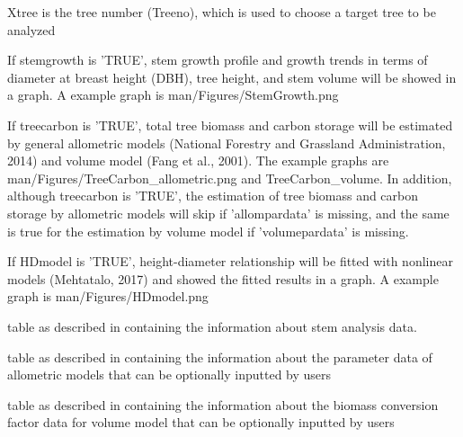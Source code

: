 \documentclass[a4paper]{book}
\begin{document}
\begin{Arguments}
\begin{ldescription}
\item[\code{xtree}] Xtree is the tree number (Treeno), which is used to choose a target tree to be analyzed

\item[\code{stemgrowth}] If stemgrowth is 'TRUE', stem growth profile and growth trends in terms of diameter at breast height (DBH), tree height, and stem volume will be showed in a graph. A example graph is man/Figures/StemGrowth.png

\item[\code{treecarbon}] If treecarbon is 'TRUE', total tree biomass and carbon storage will be estimated by general allometric models (National Forestry and Grassland Administration, 2014) and volume model (Fang et al., 2001). The example graphs are man/Figures/TreeCarbon\_allometric.png and TreeCarbon\_volume. In addition, although treecarbon is 'TRUE', the estimation of tree biomass and carbon storage by allometric models will skip if 'allompardata' is missing, and the same is true for the estimation by volume model if 'volumepardata' is missing.

\item[\code{HDmodel}] If HDmodel is 'TRUE', height-diameter relationship will be fitted with nonlinear models (Mehtatalo, 2017) and showed the fitted results in a graph. A example graph is man/Figures/HDmodel.png

\item[\code{stemdata}] table as described in  containing the information about stem analysis data.

\item[\code{allompardata}] table as described in  containing the information about the parameter data of allometric models that can be optionally inputted by users

\item[\code{volumepardata}] table as described in  containing the information about the biomass conversion factor data for volume model that can be optionally inputted by users
\end{ldescription}
\end{Arguments}
%
\end{document}
